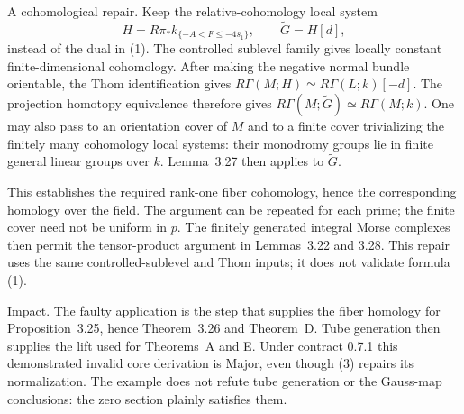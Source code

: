 \documentclass[10pt]{article}
\begin{document}
A cohomological repair. Keep the relative-cohomology local system \[H=R\pi_*k_{\{-A<F\le-4s_1\}},\qquad \widetilde G=H[d],
 \tag{3}\] instead of the dual in (1). The controlled sublevel family gives locally constant finite-dimensional cohomology. After making the negative normal bundle orientable, the Thom identification gives \(R\Gamma(M;H)\simeq R\Gamma(L;k)[-d]\). The projection homotopy equivalence therefore gives \(R\Gamma(M;\widetilde G)\simeq R\Gamma(M;k)\). One may also pass to an orientation cover of \(M\) and to a finite cover trivializing the finitely many cohomology local systems: their monodromy groups lie in finite general linear groups over \(k\). Lemma 3.27 then applies to \(\widetilde G\).\par
This establishes the required rank-one fiber cohomology, hence the corresponding homology over the field. The argument can be repeated for each prime; the finite cover need not be uniform in \(p\). The finitely generated integral Morse complexes then permit the tensor-product argument in Lemmas 3.22 and 3.28. This repair uses the same controlled-sublevel and Thom inputs; it does not validate formula (1).\par
Impact. The faulty application is the step that supplies the fiber homology for Proposition 3.25, hence Theorem 3.26 and Theorem D. Tube generation then supplies the lift used for Theorems A and E. Under contract 0.7.1 this demonstrated invalid core derivation is Major, even though (3) repairs its normalization. The example does not refute tube generation or the Gauss-map conclusions: the zero section plainly satisfies them.\par
\end{document}
